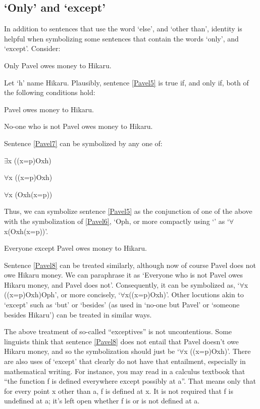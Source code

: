 \subsection{
‘Only’ and ‘except’
}
In addition to sentences that use the word ‘else’, and ‘other than’, identity is helpful when symbolizing some sentences that contain the words ‘only’, and ‘except’. Consider:
\begin{earg}
\item[\ex{Pavel5}] Only Pavel owes money to Hikaru.
\end{earg}
Let ‘h’ name Hikaru. Plausibly, sentence \ref{Pavel5} is true if, and only if, both of the following conditions hold:
\begin{earg}
\item[\ex{Pavel6}] Pavel owes money to Hikaru.
\item[\ex{Pavel7}] No-one who is not Pavel owes money to Hikaru.
\end{earg}
Sentence \ref{Pavel7} can be symbolized by any one of:
\begin{earg}
\item[]\enot $\exists$x (\enot (x=p)\eand Oxh)
\item[]$\forall$x (\enot (x=p)\eif \enot Oxh)
\item[]$\forall$x (Oxh\eif (x=p))
\end{earg}
Thus, we can symbolize sentence \ref{Pavel5} as the conjunction of one of the above with the symbolization of \ref{Pavel6}, ‘Oph, or more compactly using ‘\eiff ’ as ‘$\forall$x(Oxh\eiff (x=p))’.
\begin{earg}
\item[\ex{Pavel8}] Everyone except Pavel owes money to Hikaru.
\end{earg}
Sentence \ref{Pavel8} can be treated similarly, although now of course Pavel does not owe Hikaru money. We can paraphrase it as ‘Everyone who is not Pavel owes Hikaru money, and Pavel does not’. Consequently, it can be symbolized as, ‘$\forall$x (\enot (x=p)\eif  Oxh)\eand \enot Oph’, or more concisely, ‘$\forall$x(\enot (x=p)\eiff Oxh)’. Other locutions akin to ‘except’ such as ‘but’ or ‘besides’ (as used in ‘no-one but Pavel’ or ‘someone besides Hikaru’) can be treated in similar ways.

The above treatment of so-called “exceptives” is not uncontentious. Some linguists think that sentence \ref{Pavel8} does not entail that Pavel doesn’t owe Hikaru money, and so the symbolization should just be ‘$\forall$x (\enot (x=p)\eif Oxh)’. There are also uses of ‘except’ that clearly do not have that entailment, especially in mathematical writing. For instance, you may read in a calculus textbook that “the function f is defined everywhere except possibly at a”. That means only that for every point x other than a, f is defined at x. It is not required that f is undefined at a; it’s left open whether f is or is not defined at a.

